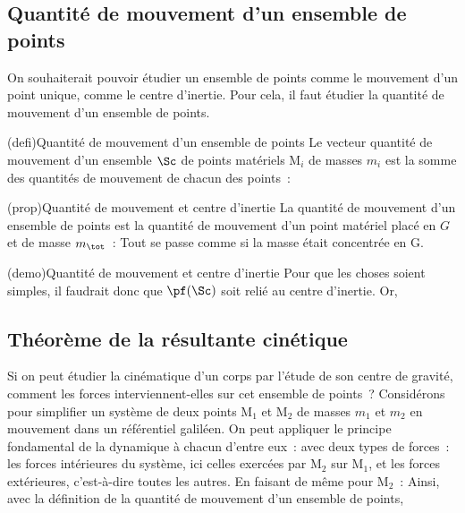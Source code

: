 \documentclass[../../main/main.tex]{subfiles}
\begin{document}
\subsection{Quantité de mouvement d'un ensemble de points}

On souhaiterait pouvoir étudier un ensemble de points comme le mouvement d'un
point unique, comme le centre d'inertie. Pour cela, il faut étudier la quantité
de mouvement d'un ensemble de points.

\begin{tcb*}(defi){Quantité de mouvement d'un ensemble de points}
	Le vecteur quantité de mouvement d'un ensemble $\Sc$ de points matériels
	M$_i$ de masses $m_i$ est la somme des quantités de mouvement de chacun des
	points~:
	\psw{
		\[
			\boxed{\pf(\Sc) = \sum_i m_i \vf(\Mr_i)}
		\]
	}
\end{tcb*}

\begin{tcb*}(prop){Quantité de mouvement et centre d'inertie}
	La quantité de mouvement d'un ensemble de points est la quantité de
	mouvement d'un point matériel placé en $G$ et de masse $m_{\tot}$~:
	\psw{
		\[
			\boxed{\pf (\Sc) = m_{\tot}\vf (\Gr)}
		\]
	}
	Tout se passe comme si la masse était concentrée en G.
\end{tcb*}

\begin{tcb}(demo){Quantité de mouvement et centre d'inertie}
	Pour que les choses soient simples, il faudrait donc que $\pf(\Sc)$ soit relié
	au centre d'inertie. Or,
	\psw{
		\[
			\vf(\Gr) = \dv{\vv{\rm OG}}{t} = \frac{1}{m_{\tot}}
			\underbracket[1pt]{\sum_i m_i \dv{{\OM}_i}{t}}_{\pf(\Sc)}
			\Lra
			\boxed{\pf(\Sc) = m_{\tot}\vf(\Gr)}
		\]
	}
\end{tcb}

\subsection{Théorème de la résultante cinétique}
Si on peut étudier la cinématique d'un corps par l'étude de son centre de
gravité, comment les forces interviennent-elles sur cet ensemble de points~?
Considérons pour simplifier un système de deux points M$_1$ et M$_2$ de masses
$m_1$ et $m_2$ en mouvement dans un référentiel galiléen. On peut appliquer le
principe fondamental de la dynamique à chacun d'entre eux~:
\psw{
	\[\dv{\pf(\Mr_1)}{t} = \Ff_{\Mr_2\ra\Mr_1} + \Ff_{\ext\ra\Mr_1}\]
}
avec deux types de forces~: les forces intérieures du système, ici celles
exercées par M$_2$ sur M$_1$, et les forces extérieures, c'est-à-dire toutes les
autres. En faisant de même pour M$_2$~:
\psw{
	\[\dv{\pf(\Mr_2)}{t} = \Ff_{\Mr_1\ra\Mr_2} + \Ff_{\ext\ra\Mr_2}\]
}
Ainsi, avec la définition de la quantité de mouvement d'un ensemble de points,
\psw{
	\[
		\dv{\pf(\Sc)}{t} =
		\underbracket[1pt]{\Ff_{\Mr_1\ra\Mr_2}+\Ff_{\Mr_2\ra\Mr_1}}_{= \of
			\text{ d'après la 3ème loi}} + \Ff_{\ext\ra\Mr_1} + \Ff_{\ext\ra\Mr_2}\]
}
\end{document}
